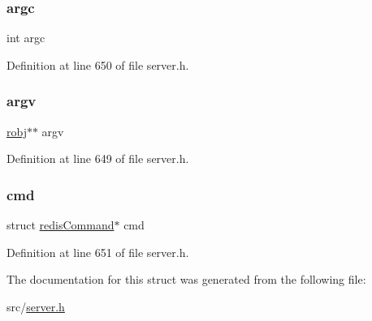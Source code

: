 \subsubsection{\texorpdfstring{argc}{argc}}
{\footnotesize\ttfamily int argc}



Definition at line 650 of file server.\+h.

\mbox{\label{structmulti_cmd_a5c75dd3cb8eb8a3f5be7d4fdf48a9ef9}} 
\subsubsection{\texorpdfstring{argv}{argv}}
{\footnotesize\ttfamily \hyperlink{server_8h_a540f174d2685422fbd7d12e3cd44c8e2}{robj}$\ast$$\ast$ argv}



Definition at line 649 of file server.\+h.

\mbox{\label{structmulti_cmd_a8ed6c4d0c6382ad1787b32d10db25c5e}} 
\subsubsection{\texorpdfstring{cmd}{cmd}}
{\footnotesize\ttfamily struct \hyperlink{structredis_command}{redis\+Command}$\ast$ cmd}



Definition at line 651 of file server.\+h.



The documentation for this struct was generated from the following file\+:\begin{DoxyCompactItemize}
\item 
src/\hyperlink{server_8h}{server.\+h}\end{DoxyCompactItemize}
